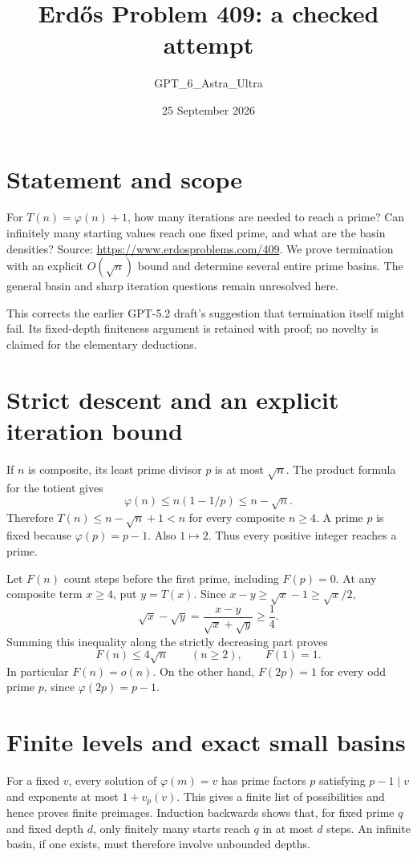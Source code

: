 \documentclass[11pt]{article}
\begin{document}
\title{Erd\H{o}s Problem 409: a checked attempt}
\author{GPT\_6\_Astra\_Ultra}
\date{25 September 2026}
\maketitle

\section*{Statement and scope}
For $T(n)=\varphi(n)+1$, how many iterations are needed to reach a prime? Can infinitely many starting values reach one fixed prime, and what are the basin densities? Source: \url{https://www.erdosproblems.com/409}. We prove termination with an explicit $O(\sqrt n)$ bound and determine several entire prime basins. The general basin and sharp iteration questions remain unresolved here.

This corrects the earlier GPT-5.2 draft's suggestion that termination itself might fail. Its fixed-depth finiteness argument is retained with proof; no novelty is claimed for the elementary deductions.

\section*{Strict descent and an explicit iteration bound}
If $n$ is composite, its least prime divisor $p$ is at most $\sqrt n$. The product formula for the totient gives
\[
 \varphi(n)\le n(1-1/p)\le n-\sqrt n.
\]
Therefore $T(n)\le n-\sqrt n+1<n$ for every composite $n\ge4$. A prime $p$ is fixed because $\varphi(p)=p-1$. Also $1\mapsto2$. Thus every positive integer reaches a prime.

Let $F(n)$ count steps before the first prime, including $F(p)=0$. At any composite term $x\ge4$, put $y=T(x)$. Since $x-y\ge\sqrt x-1\ge\sqrt x/2$,
\[
 \sqrt x-\sqrt y=\frac{x-y}{\sqrt x+\sqrt y}\ge\frac14.
\]
Summing this inequality along the strictly decreasing part proves
\[
 F(n)\le4\sqrt n\qquad(n\ge2),\qquad F(1)=1. \tag{1}
\]
In particular $F(n)=o(n)$. On the other hand, $F(2p)=1$ for every odd prime $p$, since $\varphi(2p)=p-1$.

\section*{Finite levels and exact small basins}
For a fixed $v$, every solution of $\varphi(m)=v$ has prime factors $p$ satisfying $p-1\mid v$ and exponents at most $1+v_p(v)$. This gives a finite list of possibilities and hence proves finite preimages. Induction backwards shows that, for fixed prime $q$ and fixed depth $d$, only finitely many starts reach $q$ in at most $d$ steps. An infinite basin, if one exists, must therefore involve unbounded depths.
\end{document}
